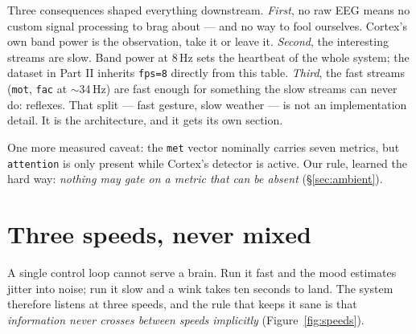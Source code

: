 \documentclass{article}
\begin{document}
Three consequences shaped everything downstream. \emph{First}, no raw EEG means no custom signal processing to brag about --- and no way to fool ourselves. Cortex's own band power is the observation, take it or leave it. \emph{Second}, the interesting streams are slow. Band power at 8\,Hz sets the heartbeat of the whole system; the dataset in Part II inherits \texttt{fps=8} directly from this table. \emph{Third}, the fast streams (\texttt{mot}, \texttt{fac} at $\sim$34\,Hz) are fast enough for something the slow streams can never do: reflexes. That split --- fast gesture, slow weather --- is not an implementation detail. It is the architecture, and it gets its own section.

One more measured caveat: the \texttt{met} vector nominally carries seven metrics, but \texttt{attention} is only present while Cortex's detector is active. Our rule, learned the hard way: \emph{nothing may gate on a metric that can be absent} (\S\ref{sec:ambient}).

\section{Three speeds, never mixed}
\label{sec:speeds}

A single control loop cannot serve a brain. Run it fast and the mood estimates jitter into noise; run it slow and a wink takes ten seconds to land. The system therefore listens at three speeds, and the rule that keeps it sane is that \emph{information never crosses between speeds implicitly} (Figure~\ref{fig:speeds}).
\end{document}

